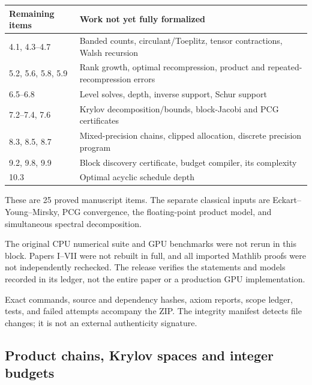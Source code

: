 \begin{center}\small
\renewcommand{\arraystretch}{1.2}
\begin{tabular}{@{}p{}p{}@{}}
\toprule
Remaining items & Work not yet fully formalized\\
\midrule
4.1, 4.3--4.7 & Banded counts, circulant/Toeplitz, tensor contractions, Walsh recursion\\
5.2, 5.6, 5.8, 5.9 & Rank growth, optimal recompression, product and repeated-recompression errors\\
6.5--6.8 & Level solves, depth, inverse support, Schur support\\
7.2--7.4, 7.6 & Krylov decomposition/bounds, block-Jacobi and PCG certificates\\
8.3, 8.5, 8.7 & Mixed-precision chains, clipped allocation, discrete precision program\\
9.2, 9.8, 9.9 & Block discovery certificate, budget compiler, its complexity\\
10.3 & Optimal acyclic schedule depth\\
\bottomrule
\end{tabular}
\end{center}
These are 25 proved manuscript items. The separate classical inputs are Eckart--Young--Mirsky, PCG convergence, the floating-point product model, and simultaneous spectral decomposition.

The original CPU numerical suite and GPU benchmarks were not rerun in this block. Papers I--VII were not rebuilt in full, and all imported Mathlib proofs were not independently rechecked. The release verifies the statements and models recorded in its ledger, not the entire paper or a production GPU implementation.

Exact commands, source and dependency hashes, axiom reports, scope ledger, tests, and failed attempts accompany the ZIP. The integrity manifest detects file changes; it is not an external authenticity signature.


\subsection{Product chains, Krylov spaces and integer budgets}\label{sec:history-3}


